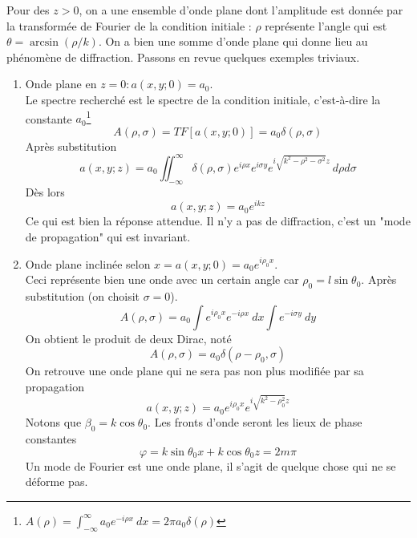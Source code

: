 Pour des $z>0$, on a une ensemble d'onde plane dont l'amplitude est donnée par la transformée de 
Fourier de la condition initiale : $\rho$ représente l'angle qui est $\theta = \arcsin(\rho/k)$. 
On a bien une somme d'onde plane qui donne lieu au phénomène de diffraction. Passons en revue 
quelques exemples triviaux.
\begin{enumerate}
\item Onde plane en $z=0 : a(x,y;0) = a_0$.\\
Le spectre recherché est le spectre de la condition initiale, c'est-à-dire la constante $a_0$\footnote{
$A(\rho) = \int_{-\infty}^\infty a_0e^{-i\rho x}\ dx = 2\pi a_0\delta(\rho)$}
\begin{equation}
A(\rho,\sigma) = TF[a(x,y;0)] = a_0\delta(\rho,\sigma)
\end{equation}
Après substitution
\begin{equation}
a(x,y;z) = a_0\iint_{-\infty}^\infty \delta(\rho,\sigma)e^{i\rho x}e^{i\sigma y} e^{i\sqrt{k^2-\rho^2-
\sigma^2}z}\ d\rho d\sigma
\end{equation}
Dès lors
\begin{equation}
a(x,y;z) = a_0e^{ikz}
\end{equation}
Ce qui est bien la réponse attendue. Il n'y a pas de diffraction, c'est un "mode de propagation" qui 
est invariant.
\item Onde plane inclinée selon $x = a(x,y;0) = a_0e^{i\rho_0x}$.\\
Ceci représente bien une onde avec un certain angle car $\rho_0 = l\sin\theta_0$. Après 
substitution (on choisit $\sigma=0$).
\begin{equation}
A(\rho,\sigma) = a_0\int e^{i\rho_0x}e^{-i\rho x}\ dx \int e^{-i\sigma y}\ dy
\end{equation}
On obtient le produit de deux Dirac, noté 
\begin{equation}
A(\rho,\sigma) = a_0\delta(\rho-\rho_0,\sigma)
\end{equation}
On retrouve une onde plane qui ne sera pas non plus modifiée par sa propagation
\begin{equation}
a(x,y;z) = a_0e^{i\rho_0x}e^{i\sqrt{k^2-\rho_0^2}z}
\end{equation}
Notons que $\beta_0 = k\cos\theta_0$. Les fronts d'onde seront les lieux de phase 
constantes
\begin{equation}
\varphi = k\sin\theta_0x + k\cos\theta_0 z = 2m\pi
\end{equation}
Un mode de Fourier est une onde plane, il s'agit de quelque chose qui ne se déforme pas.


\end{enumerate}
